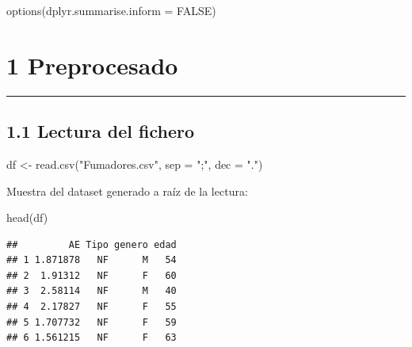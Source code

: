 \documentclass[
]{article}
\newenvironment{Shaded}{\begin{snugshade}}{\end{snugshade}}
\newcommand{\AttributeTok}[1]{\textcolor[rgb]{0.77,0.63,0.00}{#1}}
\newcommand{\ConstantTok}[1]{\textcolor[rgb]{0.00,0.00,0.00}{#1}}
\newcommand{\FunctionTok}[1]{\textcolor[rgb]{0.00,0.00,0.00}{#1}}
\newcommand{\NormalTok}[1]{#1}
\newcommand{\OtherTok}[1]{\textcolor[rgb]{0.56,0.35,0.01}{#1}}
\newcommand{\StringTok}[1]{\textcolor[rgb]{0.31,0.60,0.02}{#1}}
\begin{document}
\begin{Shaded}
\begin{Highlighting}[]
\FunctionTok{options}\NormalTok{(}\AttributeTok{dplyr.summarise.inform =} \ConstantTok{FALSE}\NormalTok{)}
\end{Highlighting}
\end{Shaded}

\newpage

\hypertarget{preprocesado}{%
\section{1 Preprocesado}\label{preprocesado}}

\begin{center}\rule{0.5\linewidth}{0.5pt}\end{center}

\hypertarget{lectura-del-fichero}{%
\subsection{1.1 Lectura del fichero}\label{lectura-del-fichero}}

\begin{Shaded}
\begin{Highlighting}[]
\NormalTok{df }\OtherTok{\textless{}{-}} \FunctionTok{read.csv}\NormalTok{(}\StringTok{"Fumadores.csv"}\NormalTok{, }\AttributeTok{sep =} \StringTok{";"}\NormalTok{, }\AttributeTok{dec =} \StringTok{"."}\NormalTok{)}
\end{Highlighting}
\end{Shaded}

\vspace{0.3cm}

Muestra del dataset generado a raíz de la lectura:

\vspace{0.3cm}

\begin{Shaded}
\begin{Highlighting}[]
\FunctionTok{head}\NormalTok{(df)}
\end{Highlighting}
\end{Shaded}

\begin{verbatim}
##         AE Tipo genero edad
## 1 1.871878   NF      M   54
## 2  1.91312   NF      F   60
## 3  2.58114   NF      M   40
## 4  2.17827   NF      F   55
## 5 1.707732   NF      F   59
## 6 1.561215   NF      F   63
\end{verbatim}
\end{document}
